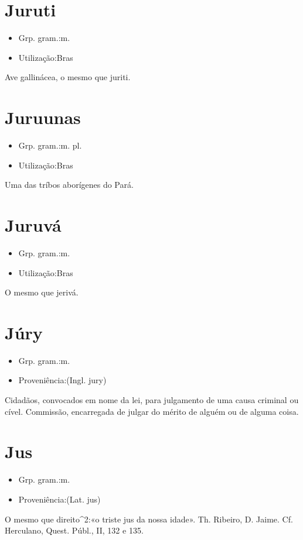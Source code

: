 \documentclass{article}
\begin{document}
\section{Juruti}
\begin{itemize}
\item {Grp. gram.:m.}
\end{itemize}
\begin{itemize}
\item {Utilização:Bras}
\end{itemize}
Ave gallinácea, o mesmo que \textunderscore juriti\textunderscore .
\section{Juruunas}
\begin{itemize}
\item {Grp. gram.:m. pl.}
\end{itemize}
\begin{itemize}
\item {Utilização:Bras}
\end{itemize}
Uma das tríbos aborígenes do Pará.
\section{Juruvá}
\begin{itemize}
\item {Grp. gram.:m.}
\end{itemize}
\begin{itemize}
\item {Utilização:Bras}
\end{itemize}
O mesmo que \textunderscore jerivá\textunderscore .
\section{Júry}
\begin{itemize}
\item {Grp. gram.:m.}
\end{itemize}
\begin{itemize}
\item {Proveniência:(Ingl. \textunderscore jury\textunderscore )}
\end{itemize}
Cidadãos, convocados em nome da lei, para julgamento de uma causa criminal ou cível.
Commissão, encarregada de julgar do mérito de alguém ou de alguma coisa.
\section{Jus}
\begin{itemize}
\item {Grp. gram.:m.}
\end{itemize}
\begin{itemize}
\item {Proveniência:(Lat. \textunderscore jus\textunderscore )}
\end{itemize}
O mesmo que \textunderscore direito\textunderscore ^2:«\textunderscore o triste jus da nossa idade\textunderscore ». Th. Ribeiro, \textunderscore D. Jaime\textunderscore . Cf. Herculano, \textunderscore Quest. Públ.\textunderscore , II, 132 e 135.
\end{document}
